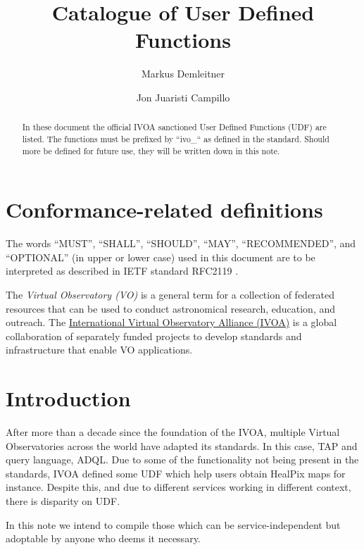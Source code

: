 \documentclass[11pt,a4paper]{ivoa}
\title{Catalogue of User Defined Functions}
\author{Markus Demleitner}
\author{Jon Juaristi Campillo}
\begin{document}
\begin{abstract}
In these document the official IVOA sanctioned User Defined Functions
(UDF) are listed. The functions must be prefixed by ``ivo\_`` as
defined in the standard. Should more be defined for future use, they
will be written down in this note.
\end{abstract}




\section*{Conformance-related definitions}

The words ``MUST'', ``SHALL'', ``SHOULD'', ``MAY'', ``RECOMMENDED'', and
``OPTIONAL'' (in upper or lower case) used in this document are to be
interpreted as described in IETF standard RFC2119 \citep{std:RFC2119}.

The \emph{Virtual Observatory (VO)} is a
general term for a collection of federated resources that can be used
to conduct astronomical research, education, and outreach.
The \href{http://www.ivoa.net}{International
Virtual Observatory Alliance (IVOA)} is a global
collaboration of separately funded projects to develop standards and
infrastructure that enable VO applications.


\section{Introduction}

After more than a decade since the foundation of the IVOA, multiple
Virtual Observatories across the world have adapted its standards. In
this case, TAP and query language, ADQL. Due to some of the
functionality not being present in the standards, IVOA defined some UDF
which help users obtain HealPix maps for instance. Despite this, and due
to different services working in different context, there is disparity
on UDF.

In this note we intend to compile those which can be service-independent
but adoptable by anyone who deems it necessary.

\end{document}
